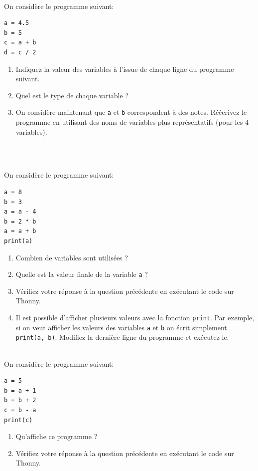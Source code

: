 \documentclass[a4paper,12pt]{article}
\begin{document}
\finexo

\newpage

\exo{}  ~\\ 
On considère le programme \py suivant:
\begin{lstlisting}[numbers=none]
a = 4.5
b = 5
c = a + b
d = c / 2
\end{lstlisting}
\begin{enumerate}[label=\alph*)]
	\item Indiquez la valeur des variables à l’issue de chaque ligne du programme suivant.
	\item Quel est le type de chaque variable ?
	\item On considère maintenant que \lstinline{a} et \lstinline{b} correspondent à des notes. Réécrivez le programme en utilisant des noms de variables plus représentatifs (pour les 4 variables).
\end{enumerate}
\begin{correction}
	~\\ 
	
\end{correction}
\finexo


\exo{}  ~\\ 
On considère le programme \py suivant:
\begin{lstlisting}[numbers=none]
a = 8
b = 3
a = a - 4
b = 2 * b
a = a + b
print(a)
\end{lstlisting}
\begin{enumerate}[label=\alph*)]
	\item Combien de variables sont utilisées ?
	\item Quelle est la valeur finale de la variable \lstinline{a} ?
	\item Vérifiez votre réponse à la question précédente en exécutant le code sur Thonny.
	\item Il est possible d’afficher plusieurs valeurs avec la fonction \lstinline{print}. Par exemple, si on veut afficher les valeurs des variables \lstinline{a} et \lstinline{b} on écrit simplement \lstinline{print(a, b)}. Modifiez la dernière ligne du programme et exécutez-le.
\end{enumerate}
\finexo

\exo{}  ~\\ 
On considère le programme \py suivant:
\begin{lstlisting}[numbers=none]
a = 5
b = a + 1
b = b + 2
c = b - a
print(c)
\end{lstlisting}
\begin{enumerate}[label=\alph*)]
	\item Qu’affiche ce programme ?
	\item Vérifiez votre réponse à la question précédente en exécutant le code sur Thonny.
\end{enumerate}
\begin{correction}
	~\\ 
	
\end{correction}
\finexo
\end{document}
